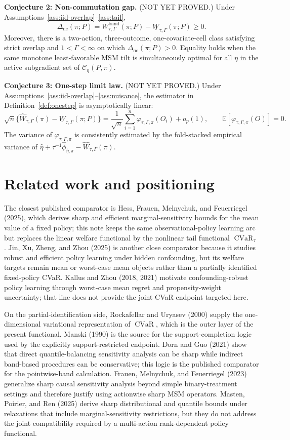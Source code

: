 \documentclass[11pt]{article}
\newcommand{\E}{\mathbb{E}}
\theoremstyle{definition}
\theoremstyle{plain}
\theoremstyle{remark}
\begin{document}
\textbf{Conjecture 2: Non-commutation gap.} (NOT YET PROVED.)  Under
Assumptions~\ref{ass:iid-overlap}--\ref{ass:tail},
\[
\Delta_{\mathrm{nc}}(\pi;P)=
W_{\tau,\Gamma}^{\mathrm{band}}(\pi;P)
-\underline W_{\tau,\Gamma}(\pi;P)\geq 0.
\]
Moreover, there is a two-action, three-outcome, one-covariate-cell class
satisfying strict overlap and \(1<\Gamma<\infty\) on which
\(\Delta_{\mathrm{nc}}(\pi;P)>0\).  Equality holds when the same monotone
least-favorable MSM tilt is simultaneously optimal for all \(\eta\) in the
active subgradient set of \(\mathcal C_\eta(P,\pi)\).

\textbf{Conjecture 3: One-step limit law.} (NOT YET PROVED.)  Under
Assumptions~\ref{ass:iid-overlap}--\ref{ass:nuisance}, the estimator in
Definition~\ref{def:onestep} is asymptotically linear:
\[
\sqrt n\{\hat W_{\tau,\Gamma}(\pi)-\underline W_{\tau,\Gamma}(\pi;P)\}
=
\frac{1}{\sqrt n}\sum_{i=1}^n
\varphi_{\tau,\Gamma,\pi}(O_i)+o_p(1),
\qquad
\E[\varphi_{\tau,\Gamma,\pi}(O)]=0.
\]
The variance of \(\varphi_{\tau,\Gamma,\pi}\) is consistently estimated by the
fold-stacked empirical variance of
\(\hat\eta+\tau^{-1}\hat\phi_{\hat\eta,\pi}-\hat W_{\tau,\Gamma}(\pi)\).

\section{Related work and positioning}
The closest published comparator is Hess, Frauen, Melnychuk, and Feuerriegel
(2025), which derives sharp and efficient marginal-sensitivity bounds for the
mean value of a fixed policy; this note keeps the same observational-policy
learning arc but replaces the linear welfare functional by the nonlinear tail
functional \(\operatorname{CVaR}_{\tau}\).  Jin, Xu, Zheng, and Zhou (2025) is
another close comparator because it studies robust and efficient policy learning
under hidden confounding, but its welfare targets remain mean or worst-case mean
objects rather than a partially identified fixed-policy CVaR.  Kallus and Zhou
(2018, 2021) motivate confounding-robust policy learning through worst-case mean
regret and propensity-weight uncertainty; that line does not provide the joint
CVaR endpoint targeted here.

On the partial-identification side, Rockafellar and Uryasev (2000) supply the
one-dimensional variational representation of \(\operatorname{CVaR}\), which is
the outer layer of the present functional.  Manski (1990) is the source for the
support-completion logic used by the explicitly support-restricted endpoint.
Dorn and Guo (2021) show that direct quantile-balancing sensitivity analysis can
be sharp while indirect band-based procedures can be conservative; this logic is
the published comparator for the pointwise-band calculation.  Frauen,
Melnychuk, and Feuerriegel (2023) generalize sharp causal sensitivity analysis
beyond simple binary-treatment settings and therefore justify using actionwise
sharp MSM operators.  Masten, Poirier, and Ren (2025) derive sharp
distributional and quantile bounds under relaxations that include
marginal-sensitivity restrictions, but they do not address the joint
compatibility required by a multi-action rank-dependent policy functional.
\end{document}
